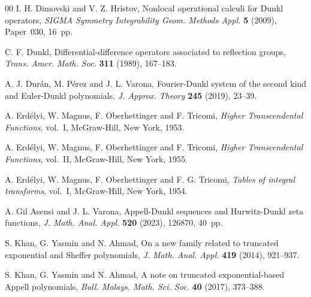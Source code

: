 \documentclass[11pt,a4paper]{amsart}
\theoremstyle{plain}
\theoremstyle{plain}
\theoremstyle{remark}
\numberwithin{equation}{section}
\begin{document}
\begin{thebibliography}{00}
I. H. Dimovski and V. Z. Hristov,
Nonlocal operational calculi for Dunkl operators,
\textit{SIGMA Symmetry Integrability Geom. Methods Appl.}
\textbf{5} (2009), Paper~030, 16~pp.

C. F. Dunkl,
{Differential-difference operators associated to reflection groups},
\textit{Trans. Amer. Math. Soc.}
\textbf{311} (1989), 167--183.

A. J. Dur\'an, M. P\'erez and J. L. Varona,
{Fourier-Dunkl system of the second kind and Euler-Dunkl polynomials},
\textit{J. Approx. Theory}
\textbf{245} (2019), 23--39.

A. Erd\'elyi, W. Magnus, F. Oberhettinger and F. Tricomi,
\textit{Higher Transcendental Functions}, 
vol.~I, McGraw-Hill, New York, 1953.

A. Erd\'elyi, W. Magnus, F. Oberhettinger and F. Tricomi,
\textit{Higher Transcendental Functions}, 
vol.~II, McGraw-Hill, New York, 1955.

A. Erd\'elyi, W. Magnus, F. Oberhettinger and F. G. Tricomi,
\textit{Tables of integral transforms},
vol.~I, McGraw-Hill, New York, 1954.


A. Gil Asensi and J. L. Varona, 
{Appell-Dunkl sequences and Hurwitz-Dunkl zeta functions}, 
\textit{J. Math. Anal. Appl.} 
\textbf{520} (2023), 126870, 40~pp. 


S. Khan, G. Yasmin and N. Ahmad,
{On a new family related to truncated exponential and Sheffer polynomials},
\textit{J. Math. Anal. Appl.} 
\textbf{419} (2014), 921--937.

S. Khan, G. Yasmin and N. Ahmad,
{A note on truncated exponential-based Appell polynomials},
\textit{Bull. Malays. Math. Sci. Soc.} 
\textbf{40} (2017), 373--388. 


\end{thebibliography}
\end{document}
